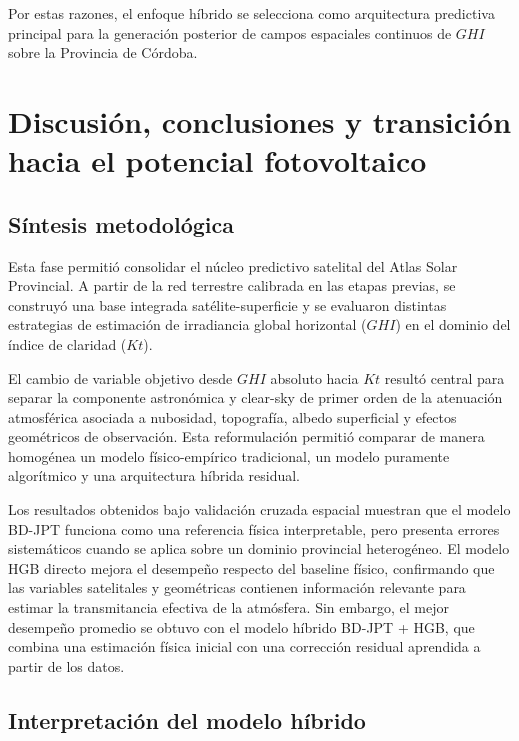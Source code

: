 \documentclass[../main.tex]{subfiles}
\begin{document}
Por estas razones, el enfoque híbrido se selecciona como arquitectura predictiva principal para la generación posterior de campos espaciales continuos de $GHI$ sobre la Provincia de Córdoba.

\clearpage %

\section{Discusión, conclusiones y transición hacia el potencial fotovoltaico}

\subsection{Síntesis metodológica}

Esta fase permitió consolidar el núcleo predictivo satelital del Atlas Solar Provincial. A partir de la red terrestre calibrada en las etapas previas, se construyó una base integrada satélite-superficie y se evaluaron distintas estrategias de estimación de irradiancia global horizontal ($GHI$) en el dominio del índice de claridad ($Kt$).

El cambio de variable objetivo desde $GHI$ absoluto hacia $Kt$ resultó central para separar la componente astronómica y clear-sky de primer orden de la atenuación atmosférica asociada a nubosidad, topografía, albedo superficial y efectos geométricos de observación. Esta reformulación permitió comparar de manera homogénea un modelo físico-empírico tradicional, un modelo puramente algorítmico y una arquitectura híbrida residual.

Los resultados obtenidos bajo validación cruzada espacial muestran que el modelo BD-JPT funciona como una referencia física interpretable, pero presenta errores sistemáticos cuando se aplica sobre un dominio provincial heterogéneo. El modelo HGB directo mejora el desempeño respecto del baseline físico, confirmando que las variables satelitales y geométricas contienen información relevante para estimar la transmitancia efectiva de la atmósfera. Sin embargo, el mejor desempeño promedio se obtuvo con el modelo híbrido BD-JPT + HGB, que combina una estimación física inicial con una corrección residual aprendida a partir de los datos.

\subsection{Interpretación del modelo híbrido}
\end{document}

